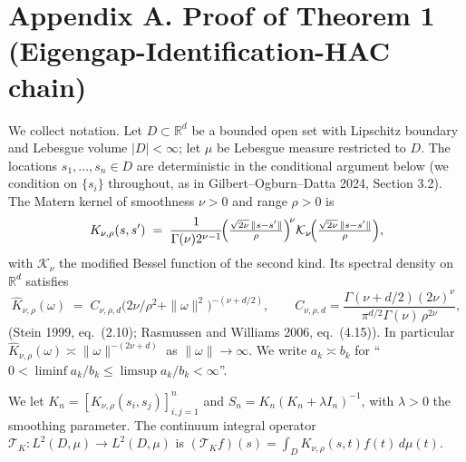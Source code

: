
\section{Appendix A. Proof of Theorem 1 (Eigengap-Identification-HAC chain)}

We collect notation. Let $D\subset\mathbb{R}^d$ be a bounded open set with
Lipschitz boundary and Lebesgue volume $|D|<\infty$; let $\mu$ be Lebesgue
measure restricted to $D$. The locations $s_1,\dots,s_n\in D$ are deterministic
in the conditional argument below (we condition on $\{s_i\}$ throughout, as
in Gilbert--Ogburn--Datta 2024, Section 3.2). The Matern kernel of smoothness
$\nu>0$ and range $\rho>0$ is
\[
K_{\nu,\rho}(s,s') \;=\; \frac{1}{\Gamma(\nu)2^{\nu-1}}
   \!\Bigl(\tfrac{\sqrt{2\nu}\,\|s-s'\|}{\rho}\Bigr)^{\!\nu}
   \mathcal{K}_\nu\!\Bigl(\tfrac{\sqrt{2\nu}\,\|s-s'\|}{\rho}\Bigr),
\]
with $\mathcal{K}_\nu$ the modified Bessel function of the second kind. Its
spectral density on $\mathbb{R}^d$ satisfies
\begin{equation}\label{eq:matern-specdens}
\widehat{K}_{\nu,\rho}(\omega) \;=\;
   C_{\nu,\rho,d}\bigl(2\nu/\rho^2 + \|\omega\|^2\bigr)^{-(\nu+d/2)},
\qquad
C_{\nu,\rho,d}=\frac{\Gamma(\nu+d/2)(2\nu)^{\nu}}{\pi^{d/2}\Gamma(\nu)\,\rho^{2\nu}},
\end{equation}
(Stein 1999, eq.~(2.10); Rasmussen and Williams 2006, eq.~(4.15)). In
particular $\widehat{K}_{\nu,\rho}(\omega)\asymp\|\omega\|^{-(2\nu+d)}$ as
$\|\omega\|\to\infty$. We write $a_k\asymp b_k$ for ``$0<\liminf a_k/b_k\le
\limsup a_k/b_k<\infty$''.

We let $K_n=[K_{\nu,\rho}(s_i,s_j)]_{i,j=1}^n$ and $S_n=K_n(K_n+\lambda I_n)^{-1}$,
with $\lambda>0$ the smoothing parameter. The continuum integral operator
$\mathcal{T}_K:L^2(D,\mu)\to L^2(D,\mu)$ is
$(\mathcal{T}_K f)(s)=\int_D K_{\nu,\rho}(s,t)f(t)\,d\mu(t)$.

